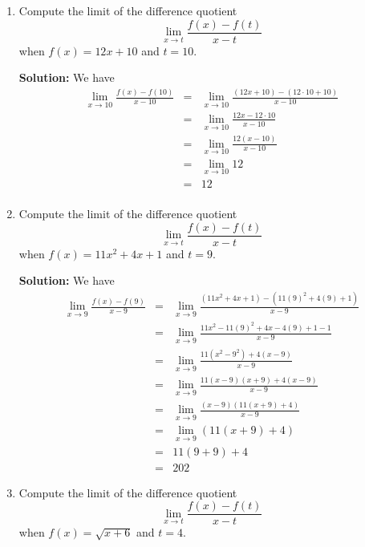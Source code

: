 \documentclass{article}
\begin{document}
\ActivityTitle[class=Calculus I, number=2, name=Continuity (Solutions)]

\begin{enumerate}
\item Compute the limit of the difference quotient \[ \lim_{x \rightarrow t} \frac{f(x) - f(t)}{x - t} \] when $f(x) = 12 x + 10$ and $t = 10$.

\textbf{Solution:} We have
\begin{eqnarray*}
\lim_{x \rightarrow 10} \frac{f(x) - f(10)}{x - 10} & = & \lim_{x \rightarrow 10} \frac{(12 x + 10) - (12 \cdot 10 + 10)}{x - 10} \\
 & = & \lim_{x \rightarrow 10} \frac{12 x - 12 \cdot 10}{x - 10} \\
 & = & \lim_{x \rightarrow 10} \frac{12(x - 10)}{x - 10} \\
 & = & \lim_{x \rightarrow 10} 12 \\
 & = & 12 \\
\end{eqnarray*}


  
\vspace{1cm}

\item Compute the limit of the difference quotient \[ \lim_{x \rightarrow t} \frac{f(x) - f(t)}{x - t} \] when $f(x) = 11 x^2 + 4 x + 1$ and $t = 9$.

\textbf{Solution:} We have
\begin{eqnarray*}
\lim_{x \rightarrow 9} \frac{f(x) - f(9)}{x - 9} & = & \lim_{x \rightarrow 9} \frac{(11 x^2 + 4 x + 1) - (11 (9)^2 + 4(9) + 1)}{x - 9} \\
 & = & \lim_{x \rightarrow 9} \frac{11 x^2 - 11(9)^2 + 4 x - 4(9) + 1 - 1}{x - 9} \\
 & = & \lim_{x \rightarrow 9} \frac{11(x^2 - 9^2) + 4(x - 9)}{x - 9} \\
 & = & \lim_{x \rightarrow 9} \frac{11(x - 9)(x + 9) + 4(x - 9)}{x - 9} \\
 & = & \lim_{x \rightarrow 9} \frac{(x - 9)(11(x + 9) + 4)}{x - 9} \\
 & = & \lim_{x \rightarrow 9} \left( 11(x + 9) + 4 \right) \\
 & = & 11(9 + 9) + 4\\
 & = & 202
\end{eqnarray*}


  
\vspace{1cm}

\item Compute the limit of the difference quotient \[ \lim_{x \rightarrow t} \frac{f(x) - f(t)}{x - t} \] when $f(x) = \sqrt{x + 6}$ and $t = 4$.


\end{enumerate}
\end{document}
